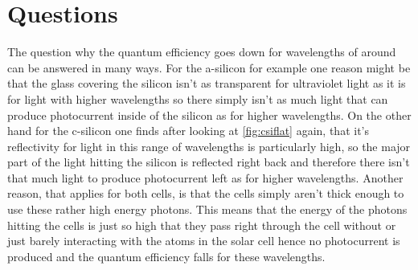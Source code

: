 \section{Questions}
The question why the quantum efficiency goes down for wavelengths of around can be answered in many ways. \newline
For the a-silicon for example one reason might be that the glass covering the silicon isn't as transparent for ultraviolet light as it is for light with higher wavelengths so there simply isn't as much light that can produce photocurrent inside of the silicon as for higher wavelengths. \newline
On the other hand for the c-silicon one finds after looking at \ref{fig:csiflat} again, that it's reflectivity for light in this range of wavelengths is particularly high, so the major part of the light hitting the silicon is reflected right back and therefore there isn't that much light to produce photocurrent left as for higher wavelengths. 
Another reason, that applies for both cells, is that the cells simply aren't thick enough to use these rather high energy photons. This means that the energy of the photons hitting the cells is just so high that they pass right through the cell without or just barely interacting with the atoms in the solar cell hence no photocurrent is produced and the quantum efficiency falls for these wavelengths. 